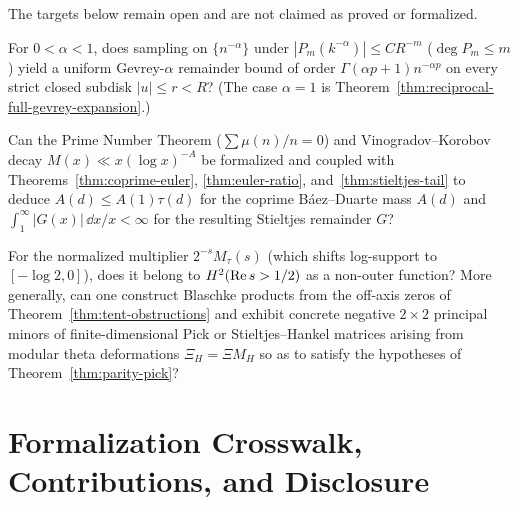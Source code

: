 The targets below remain open and are not claimed as proved or formalized.

\begin{proposition}
\label{thm:open-gevrey-alpha}
\notready
For $0 < \alpha < 1$, does sampling on $\{n^{-\alpha}\}$ under $|P_m(k^{-\alpha})| \le C R^{-m}$ ($\deg P_m \le m$) yield a uniform Gevrey-$\alpha$ remainder bound of order $\Gamma(\alpha p + 1) n^{-\alpha p}$ on every strict closed subdisk $|u| \le r < R$? (The case $\alpha = 1$ is Theorem~\ref{thm:reciprocal-full-gevrey-expansion}.)
\end{proposition}

\begin{proposition}[Unconditional PNT input and $s=3/4$ Euler-product transfer~\cite{titchmarsh1986}]
\label{thm:open-pnt-vk}
\notready
Can the Prime Number Theorem ($\sum \mu(n)/n = 0$) and Vinogradov--Korobov decay $M(x) \ll x (\log x)^{-A}$ be formalized and coupled with Theorems~\ref{thm:coprime-euler}, \ref{thm:euler-ratio}, and~\ref{thm:stieltjes-tail} to deduce $A(d) \le A(1)\tau(d)$ for the coprime B\'aez--Duarte mass $A(d)$ and $\int_1^\infty |G(x)|\,\dd x/x < \infty$ for the resulting Stieltjes remainder $G$?
\end{proposition}

\begin{proposition}
\label{thm:open-blaschke}
\notready
For the normalized multiplier $2^{-s} M_\tau(s)$ (which shifts log-support to $[-\log 2, 0]$), does it belong to $H^2(\operatorname{Re} s > 1/2)$ as a non-outer function? More generally, can one construct Blaschke products from the off-axis zeros of Theorem~\ref{thm:tent-obstructions} and exhibit concrete negative $2\times 2$ principal minors of finite-dimensional Pick or Stieltjes--Hankel matrices arising from modular theta deformations $\Xi_H = \Xi M_H$ so as to satisfy the hypotheses of Theorem~\ref{thm:parity-pick}?
\end{proposition}

\section{Formalization Crosswalk, Contributions, and Disclosure}
\label{sec:crosswalk-disclosure}

